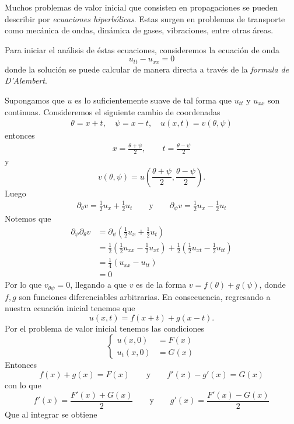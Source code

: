 Muchos problemas de valor inicial que consisten en propagaciones se pueden describir por \textit{ecuaciones hiperbólicas}. Estas surgen en problemas de transporte como mecánica de ondas, dinámica de gases, vibraciones, entre otras áreas.

Para iniciar el análisis de éstas ecuaciones, consideremos la ecuación de onda
\[
u_{tt} - u_{xx} = 0
\]
donde la solución se puede calcular de manera directa a través de la \textit{formula de D'Alembert}.

Supongamos que $u$ es lo suficientemente suave de tal forma que $u_{tt}$ y $u_{xx}$ son continuas. Consideremos el siguiente cambio de coordenadas
\begin{align*}
\theta = x + t, \quad \psi = x-t, \quad u(x,t)=v(\theta, \psi)
\end{align*}
entonces
\begin{align*}
x = \frac{\theta + \psi}{2}, \qquad t = \frac{\theta - \psi}{2}
\end{align*}
y
\[
v(\theta, \psi) = u \left( \frac{\theta + \psi}{2}, \frac{\theta - \psi}{2} \right).
\]
Luego
\begin{align*}
\partial_{\theta} v = \frac{1}{2} u_x + \frac{1}{2} u_t \qquad \text{y} \qquad \partial _{\psi} v = \frac{1}{2} u_x - \frac{1}{2} u_t
\end{align*}
Notemos que
\begin{align*}
\partial_{\psi} \partial_{\theta} v &= \partial_{\psi} \left( \frac{1}{2} u_x + \frac{1}{2} u_t \right) \\
&= \frac{1}{2} \left( \frac{1}{2} u_{xx} - \frac{1}{2} u_{xt} \right) + \frac{1}{2} \left( \frac{1}{2} u_{xt} - \frac{1}{2} u_{tt} \right) \\
&= \frac{1}{4} \left( u_{xx} - u_{tt} \right) \\
&= 0
\end{align*}
Por lo que $v_{\theta \psi} = 0$, llegando a que $v$ es de la forma $v = f(\theta) + g(\psi)$, donde $f,g$ son funciones diferenciables arbitrarias. En consecuencia, regresando a nuestra ecuación inicial tenemos que
\[
u(x,t) = f(x+t) + g(x-t).
\]
Por el problema de valor inicial tenemos las condiciones
\[
\begin{cases}
u(x,0) &= F(x) \\
u_t(x,0) &= G(x) 
\end{cases}
\]
Entonces
\[
f(x) + g(x) = F(x) \qquad \text{y} \qquad f'(x) - g'(x) = G(x)
\]
con lo que
\[
f'(x) = \frac{F'(x) + G(x)}{2} \qquad \text{y} \qquad g'(x) = \frac{F'(x) - G(x)}{2}
\]
Que al integrar se obtiene
